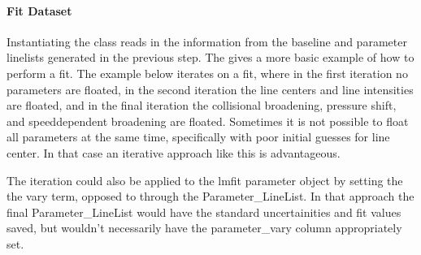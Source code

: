 \documentclass[letterpaper,10pt,english]{sphinxmanual}
\begin{document}
\paragraph{Fit Dataset}
\label{\detokenize{Fitting Synthetic Spectra:fit-dataset}}
\sphinxAtStartPar
Instantiating the {\hyperref[\detokenize{MATS:MATS.fit_dataset.Fit_DataSet}]{}} class reads in the information from the baseline and parameter linelists generated in the previous step.  The  gives a more basic example of how to perform a fit.  The example below iterates on a fit, where in the first iteration no parameters are floated, in the second iteration the line centers and line intensities are floated, and in the final iteration the collisional broadening, pressure shift, and speed\sphinxhyphen{}dependent broadening are floated.  Sometimes it is not possible to float all parameters at the same time, specifically with poor initial guesses for line center.  In that case an iterative approach like this is advantageous.

\sphinxAtStartPar
The iteration could also be applied to the lmfit parameter object by setting the the vary term, opposed to through the Parameter\_LineList.  In that approach the final Parameter\_LineList would have the standard uncertainities and fit values saved, but wouldn’t necessarily have the parameter\_vary column appropriately set.
\end{document}
